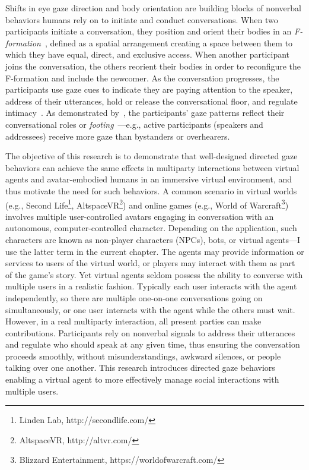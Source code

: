 Shifts in eye gaze direction and body orientation are building blocks of nonverbal behaviors humans rely on to initiate and conduct conversations. When two participants initiate a conversation, they position and orient their bodies in an \emph{F-formation}~\citep{kendon1990conducting}, defined as a spatial arrangement creating a space between them to which they have equal, direct, and exclusive access. When another participant joins the conversation, the others reorient their bodies in order to reconfigure the F-formation and include the newcomer. As the conversation progresses, the participants use gaze cues to indicate they are paying attention to the speaker, address of their utterances, hold or release the conversational floor, and regulate intimacy~\citep{heylen2006head}. As demonstrated by~\citet{mutlu2012conversational}, the participants' gaze patterns reflect their conversational roles or \emph{footing}~\citep{goffman1979footing}---e.g., active participants (speakers and addressees) receive more gaze than bystanders or overhearers.

The objective of this research is to demonstrate that well-designed directed gaze behaviors can achieve the same effects in multiparty interactions between virtual agents and avatar-embodied humans in an immersive virtual environment, and thus motivate the need for such behaviors.
A common scenario in virtual worlds (e.g., Second Life\footnote{Linden Lab, http://secondlife.com/}, AltspaceVR\footnote{AltspaceVR, http://altvr.com/}) and online games (e.g., World of Warcraft\footnote{Blizzard Entertainment, https://worldofwarcraft.com/}) involves multiple user-controlled avatars engaging in conversation with an autonomous, computer-controlled character. Depending on the application, such characters are known as non-player characters (NPCs), bots, or virtual agents---I use the latter term in the current chapter. The agents may provide information or services to users of the virtual world, or players may interact with them as part of the game's story. Yet virtual agents seldom possess the ability to converse with multiple users in a realistic fashion. Typically each user interacts with the agent independently, so there are multiple one-on-one conversations going on simultaneously, or one user interacts with the agent while the others must wait. However, in a real multiparty interaction, all present parties can make contributions. Participants rely on nonverbal signals to address their utterances and regulate who should speak at any given time, thus ensuring the conversation proceeds smoothly, without misunderstandings, awkward silences, or people talking over one another. This research introduces directed gaze behaviors enabling a virtual agent to more effectively manage social interactions with multiple users.

